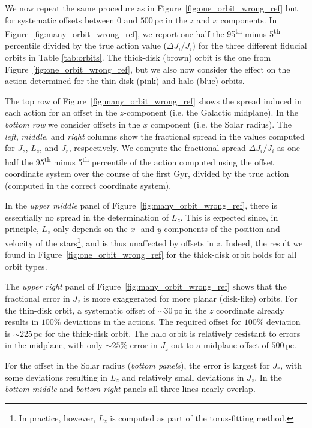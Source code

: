 \documentclass[twocolumn]{aastex62}
\newcommand{\pc}{\text{pc}}
\newcommand{\Gyr}{\text{Gyr}}
\newcommand{\uth}{\textsuperscript{th}}
\newcommand{\thincolor}{pink}
\newcommand{\thickcolor}{brown}
\newcommand{\halocolor}{blue}
\begin{document}
We now repeat the same procedure as in Figure~\ref{fig:one_orbit_wrong_ref}
but for systematic offsets between $0$ and $500\,\pc$ in the $z$ and $x$
components. In Figure~\ref{fig:many_orbit_wrong_ref}, we report one half the
95\uth{} minus 5\uth{} percentile divided by the true action value ($\Delta
J_i/J_i$) for the three different fiducial orbits in Table \ref{tab:orbits}.
The thick-disk (\thickcolor) orbit is the one from
Figure~\ref{fig:one_orbit_wrong_ref}, but we also now consider the effect on
the action determined for the thin-disk (\thincolor) and halo (\halocolor)
orbits.

The top row of Figure~\ref{fig:many_orbit_wrong_ref} shows the spread induced
in each action for an offset in the $z$-component (i.e. the Galactic
midplane). In the {\em bottom row} we consider offsets in the $x$ component
(i.e. the Solar radius). The {\em left}, {\em middle}, and {\em right} columns
show the fractional spread in the values computed for $J_z$, $L_z$, and $J_r$,
respectively. We compute the fractional spread $\Delta J_i/J_i$ as one half
the 95\uth{} minus 5\uth{} percentile of the action computed using the offset
coordinate system over the course of the first $\Gyr$, divided by the true
action (computed in the correct coordinate system).

In the {\em upper middle} panel of Figure~\ref{fig:many_orbit_wrong_ref},
there is essentially no spread in the determination of $L_z$. This is expected
since, in principle, $L_z$ only depends on the $x$- and $y$-components of the
position and velocity of the stars\footnote{In practice, however, $L_z$ is
computed as part of the torus-fitting method.}, and is thus unaffected by
offsets in $z$. Indeed, the result we found in
Figure~\ref{fig:one_orbit_wrong_ref} for the thick-disk orbit holds for all
orbit types.
 
The {\em upper right} panel of Figure~\ref{fig:many_orbit_wrong_ref} shows
that the fractional error in $J_z$ is more exaggerated for more planar
(disk-like) orbits. For the thin-disk orbit, a systematic offset of
$\sim30\,\pc$ in the $z$ coordinate already results in $100\%$ deviations in
the actions. The required offset for $100\%$ deviation is $\sim225\,\pc$ for
the thick-disk orbit. The halo orbit is relatively resistant to errors in the
midplane, with only $\sim25\%$ error in $J_z$ out to a midplane offset of
$500\,\pc$.

For the offset in the Solar radius ({\em bottom panels}), the error is largest
for $J_r$, with some deviations resulting in $L_z$ and relatively small
deviations in $J_z$. In the {\em bottom middle} and {\em bottom right} panels
all three lines nearly overlap.
\end{document}
